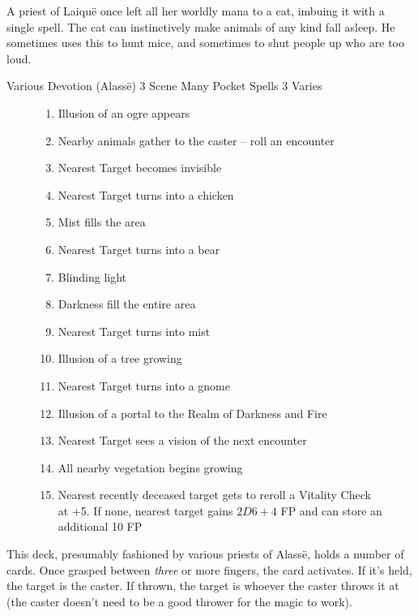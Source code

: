 \begin{multicols}{2}
A priest of Laiqu\"{e} once left all her worldly mana to a cat, imbuing it with a single spell.
The cat can instinctively make animals of any kind fall asleep.
He sometimes uses this to hunt mice, and sometimes to shut people up who are too loud.

	{Various}%
	{Devotion (Alass\"{e})}%
	{3 Scene}%
	{Many Pocket Spells}%
	{3}%
	{Varies}\label{deckofmanythings}%

\begin{figure*}[t!]
\begin{tcolorbox}
	\begin{enumerate}
		\item{Illusion of an ogre appears}
		\item{Nearby animals gather to the caster -- roll an encounter}
		\item{Nearest Target becomes invisible}
		\item{Nearest Target turns into a chicken}
		\item{Mist fills the area}
		\item{Nearest Target turns into a bear}
		\item{Blinding light}
		\item{Darkness fill the entire area}
		\item{Nearest Target turns into mist}
		\item{Illusion of a tree growing}
		\item{Nearest Target turns into a gnome}
		\item{Illusion of a portal to the Realm of Darkness and Fire}
		\item{Nearest Target sees a vision of the next encounter}
		\item{All nearby vegetation begins growing}
		\item{Nearest recently deceased target gets to reroll a Vitality Check at +5.  If none, nearest target gains $2D6+4$ FP and can store an additional 10 FP}
	\end{enumerate}
\end{tcolorbox}
\end{figure*}

This deck, presumably fashioned by various priests of Alass\"{e}, holds a number of cards.
Once grasped between \emph{three} or more fingers, the card activates.
If it's held, the target is the caster.
If thrown, the target is whoever the caster throws it at (the caster doesn't need to be a good thrower for the magic to work).


\end{multicols}
